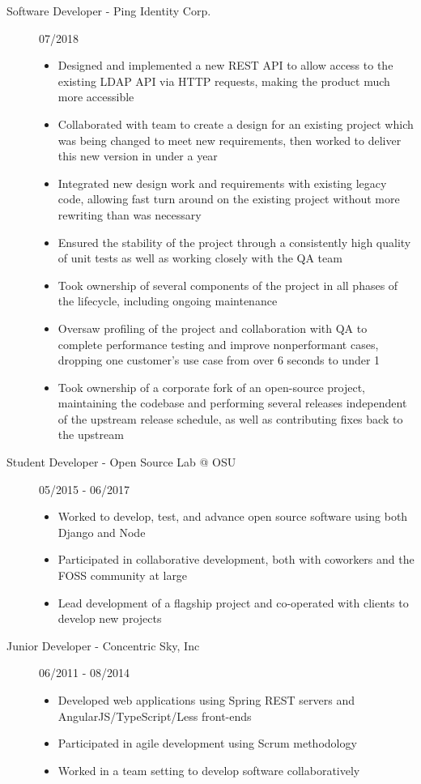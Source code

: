 \documentclass[11pt]{article}
\begin{document}
\begin{description}

\item[Software Developer - Ping Identity Corp.]
\hfill 07/2018
\begin{itemize}
\item Designed and implemented a new REST API to allow access to the existing LDAP API via HTTP requests, making the product much more accessible

\item Collaborated with team to create a design for an existing project which was being changed to meet new requirements, then worked to deliver this new version in under a year

\item Integrated new design work and requirements with existing legacy code, allowing fast turn around on the existing project without more rewriting than was necessary

\item Ensured the stability of the project through a consistently high quality of unit tests as well as working closely with the QA team

\item Took ownership of several components of the project in all phases of the lifecycle, including ongoing maintenance

\item Oversaw profiling of the project and collaboration with QA to complete performance testing and improve nonperformant cases, dropping one customer's use case from over 6 seconds to under 1

\item Took ownership of a corporate fork of an open-source project, maintaining the codebase and performing several releases independent of the upstream release schedule, as well as contributing fixes back to the upstream
\end{itemize}

\item[Student Developer - Open Source Lab @ OSU]
\hfill 05/2015 - 06/2017
\begin{itemize}
\item Worked to develop, test, and advance open source software using both Django and Node
\item Participated in collaborative development, both with coworkers and the FOSS community at large
\item Lead development of a flagship project and co-operated with clients to develop new projects
\end{itemize}

\item[Junior Developer - Concentric Sky, Inc]
\hfill 06/2011 - 08/2014
\begin{itemize}
\item Developed web applications using Spring REST servers and AngularJS/TypeScript/Less front-ends
\item Participated in agile development using Scrum methodology
\item Worked in a team setting to develop software collaboratively
\end{itemize}
\end{description}
\end{document}
